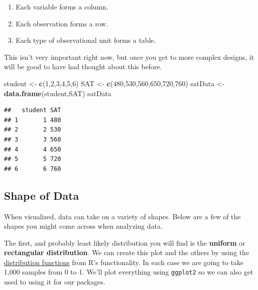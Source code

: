 \documentclass[]{book}
\newenvironment{Shaded}{\begin{snugshade}}{\end{snugshade}}
\newcommand{\KeywordTok}[1]{\textcolor[rgb]{0.13,0.29,0.53}{\textbf{#1}}}
\newcommand{\DecValTok}[1]{\textcolor[rgb]{0.00,0.00,0.81}{#1}}
\newcommand{\StringTok}[1]{\textcolor[rgb]{0.31,0.60,0.02}{#1}}
\newcommand{\NormalTok}[1]{#1}
\providecommand{\tightlist}{%
  \setlength{\itemsep}{0pt}\setlength{\parskip}{0pt}}
\theoremstyle{definition}
\theoremstyle{definition}
\theoremstyle{definition}
\theoremstyle{remark}
\begin{document}
\begin{enumerate}
\def\labelenumi{\arabic{enumi}.}
\tightlist
\item
  Each variable forms a column.
\item
  Each observation forms a row.
\item
  Each type of observational unit forms a table.
\end{enumerate}

This isn't very important right now, but once you get to more complex
designs, it will be good to have had thought about this before.

\begin{Shaded}
\begin{Highlighting}[]
\NormalTok{student <-}\StringTok{ }\KeywordTok{c}\NormalTok{(}\DecValTok{1}\NormalTok{,}\DecValTok{2}\NormalTok{,}\DecValTok{3}\NormalTok{,}\DecValTok{4}\NormalTok{,}\DecValTok{5}\NormalTok{,}\DecValTok{6}\NormalTok{)}
\NormalTok{SAT <-}\StringTok{ }\KeywordTok{c}\NormalTok{(}\DecValTok{480}\NormalTok{,}\DecValTok{530}\NormalTok{,}\DecValTok{560}\NormalTok{,}\DecValTok{650}\NormalTok{,}\DecValTok{720}\NormalTok{,}\DecValTok{760}\NormalTok{)}
\NormalTok{satData <-}\StringTok{ }\KeywordTok{data.frame}\NormalTok{(student,SAT)}
\NormalTok{satData}
\end{Highlighting}
\end{Shaded}

\begin{verbatim}
##   student SAT
## 1       1 480
## 2       2 530
## 3       3 560
## 4       4 650
## 5       5 720
## 6       6 760
\end{verbatim}

\subsection{Shape of Data}\label{shape-of-data}

When visualized, data can take on a variety of shapes. Below are a few
of the shapes you might come across when analyzing data.

The first, and probably least likely distribution you will find is the
\textbf{uniform} or \textbf{rectangular distribution}. We can create
this plot and the others by using the
\href{https://en.wikibooks.org/wiki/R_Programming/Probability_Distributions\#Uniform_distribution}{distribution
functions} from R's functionality. In each case we are going to take
1,000 samples from 0 to 1. We'll plot everything using \texttt{ggplot2}
so we can also get used to using it for our packages.
\end{document}
